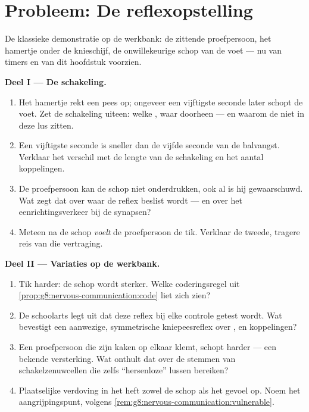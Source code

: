 \section{Probleem: De reflexopstelling}

\begin{problem}\label{pb:g8:nervous-communication:1}
De klassieke demonstratie op de werkbank: de zittende proefpersoon, het
hamertje onder de knieschijf, de onwillekeurige schop van de voet --- nu
van timers en van dit hoofdstuk voorzien.

\medskip\noindent\textbf{Deel I --- De schakeling.}
\begin{enumerate}
  \item Het hamertje rekt een pees op; ongeveer een vijftigste seconde
        later schopt de voet. Zet de schakeling uiteen: welke 
        , waar doorheen --- en waarom de  niet in deze
        lus zitten.
  \item Een vijftigste seconde is sneller dan de vijfde seconde van de
        balvangst. Verklaar het verschil met de lengte van de schakeling
        en het aantal koppelingen.
  \item De proefpersoon kan de schop niet onderdrukken, ook al is hij
        gewaarschuwd. Wat zegt dat over waar de reflex beslist wordt ---
        en over het eenrichtingsverkeer bij de synapsen?
  \item Meteen na de schop \emph{voelt} de proefpersoon de tik. Verklaar
        de tweede, tragere reis van die vertraging.
\end{enumerate}

\medskip\noindent\textbf{Deel II --- Variaties op de werkbank.}
\begin{enumerate}[resume]
  \item Tik harder: de schop wordt sterker. Welke coderingsregel uit
        \cref{prop:g8:nervous-communication:code} liet zich zien?
  \item De schoolarts legt uit dat deze reflex bij elke controle getest
        wordt. Wat bevestigt een aanwezige, symmetrische kniepeesreflex
        over ,  en koppelingen?
  \item Een proefpersoon die zijn kaken op elkaar klemt, schopt harder ---
        een bekende versterking. Wat onthult dat over de stemmen van
        schakelzenuwcellen die zelfs ``hersenloze'' lussen bereiken?
  \item Plaatselijke verdoving in het  heft zowel de schop als het
        gevoel op. Noem het aangrijpingspunt, volgens
        \cref{rem:g8:nervous-communication:vulnerable}.
\end{enumerate}


\end{problem}
